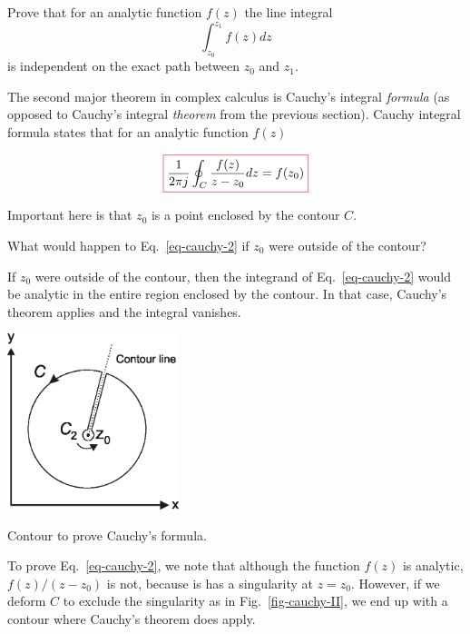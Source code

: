 \begin{exer}
Prove that for an analytic function $f(z)$ the line integral 
$$\int_{z_0}^{z_1}f(z)dz$$
is independent on the exact path between $z_0$ and $z_1$.
\end{exer}


\pagebreak


\label{week1}

The second major theorem in complex calculus is Cauchy's integral \emph{formula} (as opposed to Cauchy's integral \emph{theorem} from the previous section). Cauchy integral formula states that for an analytic function $f(z)$

\begin{equation}
\fbox{$\displaystyle
\frac{1}{2 \pi j}\oint_{{C}} \frac{f(z)} {z-z_0} dz = f(z_0)
\label{eq-cauchy-2}
$}
\end{equation}

Important here is that $z_0$ is a point enclosed by the contour ${C}$.

\begin{cue}
What would happen to Eq.~\ref{eq-cauchy-2} if  $z_0$ were outside of the contour?  
\end{cue}

If $z_0$ were outside of the contour, then the integrand of Eq.~\ref{eq-cauchy-2} would be analytic in the entire region enclosed by the contour. In that case, Cauchy's theorem applies and the integral vanishes.

\begin{marginfigure}[-1cm]
\centering
\includegraphics[width=5cm]{complex/figures/cauchy_II}
\caption{Contour to prove Cauchy's formula.}
\label{fig-cauchy-II}
\end{marginfigure}

To prove Eq.~\ref{eq-cauchy-2}, we note that although the function $f(z)$ is analytic, $f(z)/(z-z_0)$ is not, because is has a singularity at $z=z_0$. However, if we deform ${C}$ to exclude the singularity as in Fig.~\ref{fig-cauchy-II}, we end up with a contour where Cauchy's theorem does apply.

